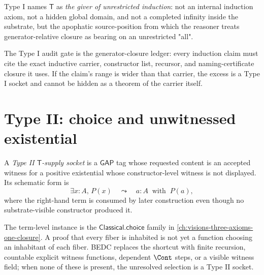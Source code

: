 \begin{definition}
\label{def:transcendental-supply-type-I-reading}
Type I names $\mathsf{T}$ as \emph{the giver of unrestricted induction}: not an internal induction axiom, not a hidden global domain, and not a completed infinity inside the substrate, but the apophatic source-position from which the reasoner treats generator-relative closure as bearing on an unrestricted "all".
\end{definition}

\begin{remark}
\label{rem:transcendental-supply-type-I-gate}
The Type I audit gate is the generator-closure ledger: every induction claim must cite the exact inductive carrier, constructor list, recursor, and naming-certificate closure it uses. If the claim's range is wider than that carrier, the excess is a Type I socket and cannot be hidden as a theorem of the carrier itself.
\end{remark}

\section{Type II: choice and unwitnessed existential}
\label{sec:transcendental-supply-type-II}

\begin{definition}
\label{def:transcendental-supply-type-II}
A \emph{Type II $\mathsf{T}$-supply socket} is a $\mathsf{GAP}$ tag whose requested content is an accepted witness for a positive existential whose constructor-level witness is not displayed. Its schematic form is
$$
\exists x:A,\,P(x)
\quad\leadsto\quad
a:A\;\;\text{with}\;\;P(a),
$$
where the right-hand term is consumed by later construction even though no substrate-visible constructor produced it.
\end{definition}

\begin{example}
\label{ex:transcendental-supply-type-II-engineering}
The term-level instance is the $\mathsf{Classical.choice}$ family in \autoref{ch:visions-three-axioms-one-closure}. A proof that every fiber is inhabited is not yet a function choosing an inhabitant of each fiber. BEDC replaces the shortcut with finite recursion, countable explicit witness functions, dependent $\Cont$ steps, or a visible witness field; when none of these is present, the unresolved selection is a Type II socket.
\end{example}

